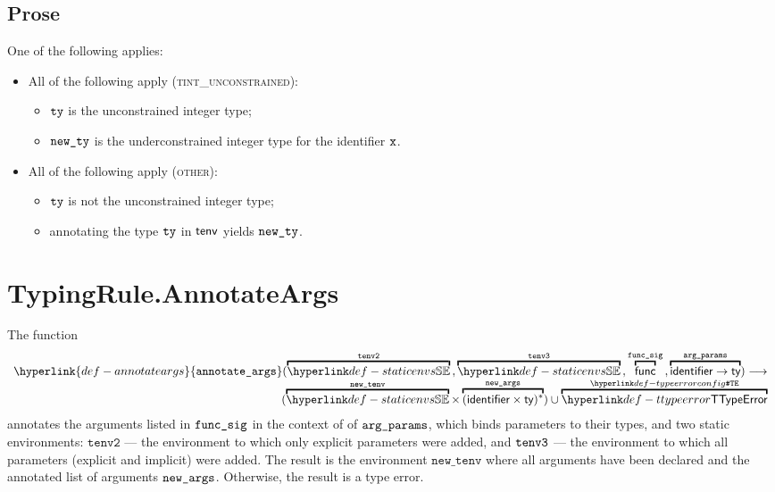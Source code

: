 \documentclass{book}
\newcommand\OrTypeError[0]{\;\terminateas \TypeErrorConfig}
\newcommand\ProseOrTypeError[0]{\ProseTerminateAs{\TypeErrorConfig}}
\newcommand\annotaterel[0]{\hyperlink{def-annotaterel}{\textsf{type}}}
\newcommand\typearrow[0]{\xrightarrow{\annotaterel}}
\newcommand\annotateparamtype[0]{\hyperlink{def-annotateparamtype}{\texttt{annotate\_param\_type}}}
\newcommand\annotateargs[0]{\hyperlink{def-annotateargs}{\texttt{annotate\_args}}}
\newcommand\annotatetype[1]{\hyperlink{def-annotatetype}{\texttt{annotate\_type}}(#1)}
\newcommand\newtenv[0]{\texttt{new\_tenv}}
\newcommand\tenvtwo[0]{\texttt{tenv2}}
\begin{document}
\subsection{Prose}
One of the following applies:
\begin{itemize}
  \item All of the following apply (\textsc{tint\_unconstrained}):
  \begin{itemize}
    \item $\texttt{ty}$ is the unconstrained integer type;
    \item $\texttt{new\_ty}$ is the underconstrained integer type for the identifier $\texttt{x}$.
  \end{itemize}

  \item All of the following apply (\textsc{other}):
  \begin{itemize}
    \item $\texttt{ty}$ is not the unconstrained integer type;
    \item annotating the type $\texttt{ty}$ in $\textsf{tenv}$ yields $\texttt{new\_ty}$\ProseOrTypeError.
  \end{itemize}
\end{itemize}


\section{TypingRule.AnnotateArgs \label{sec:TypingRule.AnnotateArgs}}
\hypertarget{def-annotateargs}{}
The function
\[
\begin{array}{r}
\annotateargs(
  \overname{\staticenvs}{\tenvtwo} \aslsep
  \overname{\staticenvs}{\tenvthree} \aslsep
  \overname{\func}{\funcsig} \aslsep
  \overname{\identifier\rightarrow\ty}{\argparams}
)
\aslto \\
(\overname{\staticenvs}{\newtenv} \times \overname{(\identifier\times\ty)^*}{\vnewargs})
\cup \overname{\TTypeError}{\TypeErrorConfig}
\end{array}
\]
annotates the arguments listed in $\texttt{func\_sig}$ in the context of
of $\texttt{arg\_params}$, which binds parameters to their types,
and two static environments:
$\tenvtwo$ --- the environment to which only explicit parameters were added, and
$\texttt{tenv3}$ --- the environment to which all parameters (explicit and implicit) were added.
The result is the environment $\newtenv$ where all arguments have been declared and
the annotated list of arguments $\texttt{new\_args}$.
Otherwise, the result is a type error.
\end{document}
